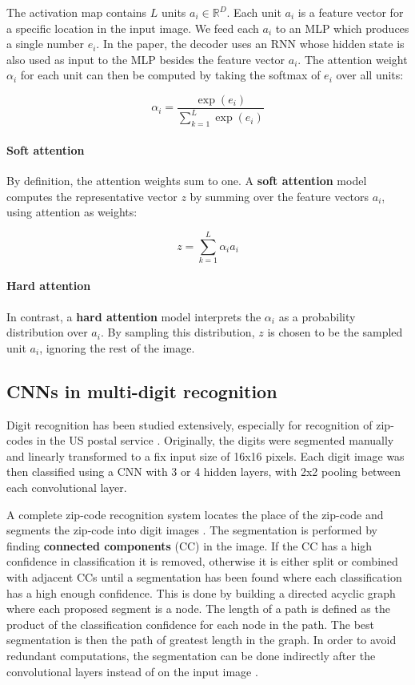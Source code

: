 The activation map contains $L$ units $a_i \in \mathbb{R}^D$.
Each unit $a_i$ is a feature vector for a specific location in the input image. We feed each $a_i$ to an MLP which produces a single number $e_i$. In the paper, the decoder uses an RNN whose hidden state is also used as input to the MLP besides the feature vector $a_i$.
The attention weight $\alpha_i$ for each unit can then be computed by taking the softmax of $e_i$ over all units:

\[
\alpha_i = \frac{ \exp(e_i) }{ \sum_{k=1}^L \exp(e_i) }
\]

\paragraph{Soft attention}
By definition, the attention weights sum to one. A \textbf{soft attention} model computes the representative vector $z$ by summing over the feature vectors $a_i$, using attention as weights:

\[
z = \sum_{k=1}^L \alpha_i a_i
\]

\paragraph{Hard attention}
In contrast, a \textbf{hard attention} model interprets the $\alpha_i$ as a probability distribution over $a_i$. By sampling this distribution, $z$ is chosen to be the sampled unit $a_i$, ignoring the rest of the image.


\subsection{CNNs in multi-digit recognition}

Digit recognition has been studied extensively, especially for recognition of zip-codes in the US postal service \cite{lecun_1989, lecun_1990}. Originally, the digits were segmented manually and linearly transformed to a fix input size of 16x16 pixels.
Each digit image was then classified using a CNN with 3 or 4 hidden layers, with 2x2 pooling between each convolutional layer.

A complete zip-code recognition system locates the place of the zip-code and segments the zip-code into digit images \cite{zipcode_system}. The segmentation is performed by finding \textbf{connected components} (CC) in the image. If the CC has a high confidence in classification it is removed, otherwise it is either split or combined with adjacent CCs until a segmentation has been found where each classification has a high enough confidence. This is done by building a directed acyclic graph where each proposed segment is a node. The length of a path is defined as the product of the classification confidence for each node in the path. The best segmentation is then the path of greatest length in the graph. In order to avoid redundant computations, the segmentation can be done indirectly after the convolutional layers instead of on the input image \cite{lecun_multidigit}.

